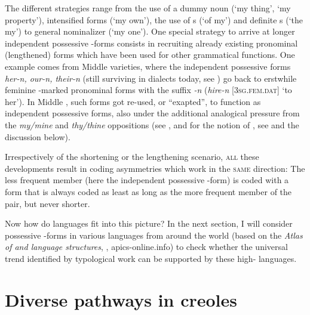 \documentclass[output=paper]{langsci/langscibook}
\begin{document}
The different strategies range from the use of a dummy noun (‘my thing’, ‘my property’), intensified  forms (‘my own’), the use of s (‘of my’) and definite s (‘the my’) to general nominalizer (‘my one’). One special strategy to arrive at longer independent possessive -forms consists in recruiting already existing pronominal (lengthened) forms which have been used for other grammatical functions. One example comes from Middle  varieties, where the independent possessive forms \textit{her-n, our-n, their-n} (still surviving in  dialects today, see \citealt{KortmannLunkenheimer2013}) go back to erstwhile feminine  -marked pronominal forms with the suffix \textit{{}-n} (\textit{hire-n} [\textsc{3sg.fem.dat}] ‘to her’). In Middle , such  forms got re-used, or “exapted”, to function as independent possessive forms, also under the additional analogical pressure from the \textit{my/mine} and \textit{thy/thine} oppositions (see \citealt{Allen2002}, and for the notion of , see \citealt{Lass1990,Lass2017,NordeVandeVelde2016} and the discussion below). 

Irrespectively of the shortening or the lengthening scenario, \textsc{all} these developments result in coding asymmetries which work in the \textsc{same} direction: The less frequent member (here the independent possessive -form) is coded with a form that is always coded as least as long as the more frequent member of the pair, but never shorter.

\newpage 
Now how do  languages fit into this picture? In the next section, I will consider possessive -forms in various  languages from around the world (based on the \textit{Atlas of  and  language structures}, \citealt{MichaelisEtAl2013}, apics-online.info) to check whether the universal trend identified by typological work can be supported by these high- languages.


\section{Diverse pathways in {creole}s}\label{sec:michaelis:4}
\end{document}
